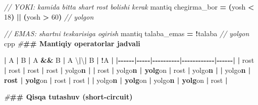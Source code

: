 \documentclass[a4paper,11pt,twoside,openright]{book}
\newenvironment{Shaded}{\begin{snugshade}}{\end{snugshade}}
\newcommand{\CharTok}[1]{\textcolor[rgb]{0.31,0.60,0.02}{#1}}
\newcommand{\CommentTok}[1]{\textcolor[rgb]{0.56,0.35,0.01}{\textit{#1}}}
\newcommand{\DecValTok}[1]{\textcolor[rgb]{0.00,0.00,0.81}{#1}}
\newcommand{\ErrorTok}[1]{\textcolor[rgb]{0.64,0.00,0.00}{\textbf{#1}}}
\newcommand{\NormalTok}[1]{#1}
\newcommand{\OperatorTok}[1]{\textcolor[rgb]{0.81,0.36,0.00}{\textbf{#1}}}
\newcommand{\PreprocessorTok}[1]{\textcolor[rgb]{0.56,0.35,0.01}{\textit{#1}}}
\begin{document}
\begin{Shaded}
\begin{Highlighting}[]
\CommentTok{// YOKI: kamida bitta shart rost bo\textquotesingle{}lishi kerak}
\NormalTok{mantiq chegirma\_bor }\OperatorTok{=} \OperatorTok{(}\NormalTok{yosh }\OperatorTok{\textless{}} \DecValTok{18}\OperatorTok{)} \OperatorTok{||} \OperatorTok{(}\NormalTok{yosh }\OperatorTok{\textgreater{}} \DecValTok{60}\OperatorTok{)}  \CommentTok{// yolg\textquotesingle{}on}

\CommentTok{// EMAS: shartni teskarisiga o\textquotesingle{}girish}
\NormalTok{mantiq talaba\_emas }\OperatorTok{=} \OperatorTok{!}\NormalTok{talaba                       }\CommentTok{// yolg\textquotesingle{}on}
\ErrorTok{\textasciigrave{}\textasciigrave{}\textasciigrave{}}\NormalTok{cpp}
\PreprocessorTok{\#}\ErrorTok{\#\# Mantiqiy operatorlar jadvali}

\OperatorTok{|} \ErrorTok{\textasciigrave{}}\NormalTok{A}\ErrorTok{\textasciigrave{}} \OperatorTok{|} \ErrorTok{\textasciigrave{}}\NormalTok{B}\ErrorTok{\textasciigrave{}} \OperatorTok{|} \ErrorTok{\textasciigrave{}}\NormalTok{A }\OperatorTok{\&\&}\NormalTok{ B}\ErrorTok{\textasciigrave{}} \OperatorTok{|} \ErrorTok{\textasciigrave{}}\NormalTok{A \textbackslash{}}\OperatorTok{|}\NormalTok{\textbackslash{}}\OperatorTok{|}\NormalTok{ B}\ErrorTok{\textasciigrave{}} \OperatorTok{|} \ErrorTok{\textasciigrave{}}\OperatorTok{!}\NormalTok{A}\ErrorTok{\textasciigrave{}} \OperatorTok{|}
\OperatorTok{|{-}{-}{-}{-}{-}{-}|{-}{-}{-}{-}{-}|{-}{-}{-}{-}{-}{-}{-}{-}{-}{-}|{-}{-}{-}{-}{-}{-}{-}{-}{-}{-}{-}{-}|{-}{-}{-}{-}{-}{-}|}
\OperatorTok{|}\NormalTok{ rost }\OperatorTok{|}\NormalTok{ rost }\OperatorTok{|}\NormalTok{ rost }\OperatorTok{|}\NormalTok{ rost }\OperatorTok{|}\NormalTok{ yolg}\CharTok{\textquotesingle{}o}\ErrorTok{n |}
\OperatorTok{|}\NormalTok{ rost }\OperatorTok{|}\NormalTok{ yolg}\CharTok{\textquotesingle{}o}\ErrorTok{n | yolg}\CharTok{\textquotesingle{}}\NormalTok{on }\OperatorTok{|}\NormalTok{ rost }\OperatorTok{|}\NormalTok{ yolg}\CharTok{\textquotesingle{}o}\ErrorTok{n |}
\OperatorTok{|}\NormalTok{ yolg}\CharTok{\textquotesingle{}o}\ErrorTok{n | rost | yolg}\CharTok{\textquotesingle{}}\NormalTok{on }\OperatorTok{|}\NormalTok{ rost }\OperatorTok{|}\NormalTok{ rost }\OperatorTok{|}
\OperatorTok{|}\NormalTok{ yolg}\CharTok{\textquotesingle{}o}\ErrorTok{n | yolg}\CharTok{\textquotesingle{}}\NormalTok{on }\OperatorTok{|}\NormalTok{ yolg}\CharTok{\textquotesingle{}o}\ErrorTok{n | yolg}\CharTok{\textquotesingle{}}\NormalTok{on }\OperatorTok{|}\NormalTok{ rost }\OperatorTok{|}

\PreprocessorTok{\#}\ErrorTok{\#\# Qisqa tutashuv (short{-}circuit)}


\end{Highlighting}
\end{Shaded}
\end{document}
